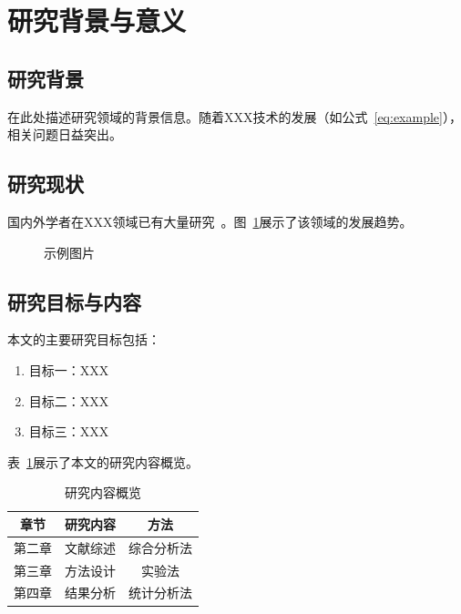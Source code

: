 \section{研究背景与意义}

\subsection{研究背景}
\label{sec:background}

在此处描述研究领域的背景信息。随着XXX技术的发展（如公式~\ref{eq:example}），相关问题日益突出。

\subsection{研究现状}
\label{sec:current}

国内外学者在XXX领域已有大量研究~\cite{zhang2023,l wang2022}。图~\ref{fig:example}展示了该领域的发展趋势。

\begin{figure}[H]
  \centering
  \caption{示例图片}
  \label{fig:example}
\end{figure}

\subsection{研究目标与内容}
\label{sec:objectives}

本文的主要研究目标包括：
\begin{enumerate}
  \item 目标一：XXX
  \item 目标二：XXX
  \item 目标三：XXX
\end{enumerate}

表~\ref{tab:example}展示了本文的研究内容概览。

\begin{table}[H]
  \centering
  \caption{研究内容概览}
  \label{tab:example}
  \begin{tabular}{ccc}
    \toprule
    章节 & 研究内容 & 方法 \\
    \midrule
    第二章 & 文献综述 & 综合分析法 \\
    第三章 & 方法设计 & 实验法 \\
    第四章 & 结果分析 & 统计分析法 \\
    \bottomrule
  \end{tabular}
\end{table}

